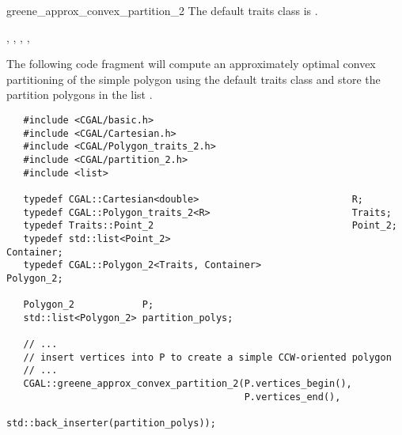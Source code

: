 \begin{ccRefFunction}{greene_approx_convex_partition_2}
The default traits class  is .

\ccSeeAlso
{},
,
,
,

\ccExample
The following code fragment will compute an approximately optimal
convex partitioning of the simple polygon  using the default
traits class and store the partition polygons in the list 
.

\begin{verbatim}
   #include <CGAL/basic.h>
   #include <CGAL/Cartesian.h>
   #include <CGAL/Polygon_traits_2.h>
   #include <CGAL/partition_2.h>
   #include <list>

   typedef CGAL::Cartesian<double>                           R;
   typedef CGAL::Polygon_traits_2<R>                         Traits;
   typedef Traits::Point_2                                   Point_2;
   typedef std::list<Point_2>                                Container;
   typedef CGAL::Polygon_2<Traits, Container>                Polygon_2;

   Polygon_2            P;
   std::list<Polygon_2> partition_polys;

   // ...
   // insert vertices into P to create a simple CCW-oriented polygon
   // ...
   CGAL::greene_approx_convex_partition_2(P.vertices_begin(),
                                          P.vertices_end(),
                                          std::back_inserter(partition_polys));
\end{verbatim}


\end{ccRefFunction}
